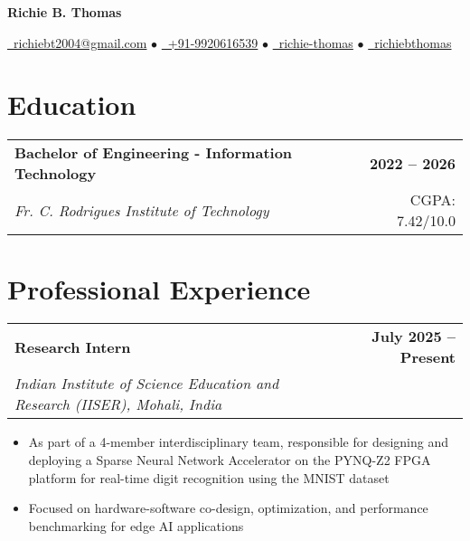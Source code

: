 \documentclass[10pt,a4paper]{article}
\makeatletter
\newcommand{\resumeItem}[1]{\item\small{#1}}
\newcommand{\resumeSubheading}[4]{
  \vspace{-1pt}
  \begin{tabular*}{\textwidth}[t]{l@{\extracolsep{\fill}}r}
    \textbf{#1} & \textcolor{light}{\small\textbf{#2}} \\
    \textit{\small#3} & \textcolor{light}{\small#4} \\
  \end{tabular*}\vspace{-5pt}
}
\makeatother
\begin{document}
\begin{center}
    {\LARGE\bfseries\color{primary} Richie B. Thomas}
    
    \vspace{0.3em}
    
    \href{mailto:richiebt2004@gmail.com}{\faEnvelope\ richiebt2004@gmail.com} $\bullet$
    \href{tel:+919920616539}{\faMobile\ +91-9920616539} $\bullet$
    \href{https://www.linkedin.com/in/richie-thomas/}{\faLinkedin\ richie-thomas} $\bullet$
    \href{https://github.com/richiebthomas}{\faGithub\ richiebthomas}
\end{center}

\vspace{0.2em}

\section{Education}

\resumeSubheading
{Bachelor of Engineering - Information Technology}{2022 -- 2026}
{Fr. C. Rodrigues Institute of Technology}{CGPA: 7.42/10.0}

\vspace{0.1em}

\section{Professional Experience}

\resumeSubheading
{Research Intern}{\textbf{July 2025 -- Present}}
{Indian Institute of Science Education and Research (IISER), Mohali, India}{}
\begin{itemize}
    \resumeItem{As part of a 4-member interdisciplinary team, responsible for designing and deploying a Sparse Neural Network Accelerator on the PYNQ-Z2 FPGA platform for real-time digit recognition using the MNIST dataset}
    \resumeItem{Focused on hardware-software co-design, optimization, and performance benchmarking for edge AI applications}
\end{itemize}
\end{document}

